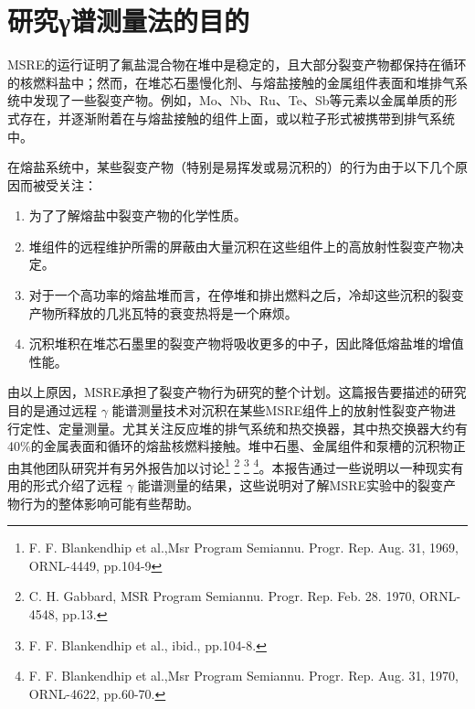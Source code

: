 \chapter{研究γ谱测量法的目的}
MSRE的运行证明了氟盐混合物在堆中是稳定的，且大部分裂变产物都保持在循环的核燃料盐中；然而，在堆芯石墨慢化剂、与熔盐接触的金属组件表面和堆排气系统中发现了一些裂变产物。例如，Mo、Nb、Ru、Te、Sb等元素以金属单质的形式存在，并逐渐附着在与熔盐接触的组件上面，或以粒子形式被携带到排气系统中。

在熔盐系统中，某些裂变产物（特别是易挥发或易沉积的）的行为由于以下几个原因而被受关注：
\begin{enumerate}
\item 为了了解熔盐中裂变产物的化学性质。
\item 堆组件的远程维护所需的屏蔽由大量沉积在这些组件上的高放射性裂变产物决定。
\item 对于一个高功率的熔盐堆而言，在停堆和排出燃料之后，冷却这些沉积的裂变产物所释放的几兆瓦特的衰变热将是一个麻烦。
\item 沉积堆积在堆芯石墨里的裂变产物将吸收更多的中子，因此降低熔盐堆的增值性能。
\end{enumerate}
由以上原因，MSRE承担了裂变产物行为研究的整个计划。这篇报告要描述的研究目的是通过远程 $\gamma$ 能谱测量技术对沉积在某些MSRE组件上的放射性裂变产物进行定性、定量测量。尤其关注反应堆的排气系统和热交换器，其中热交换器大约有40\%的金属表面和循环的熔盐核燃料接触。堆中石墨、金属组件和泵槽的沉积物正由其他团队研究并有另外报告加以讨论\footnote{F. F. Blankendhip et al.,Msr Program Semiannu. Progr. Rep. Aug. 31, 1969, ORNL-4449, pp.104-9} \footnote{C. H. Gabbard, MSR Program Semiannu. Progr. Rep. Feb. 28. 1970, ORNL-4548, pp.13.} \footnote{F. F. Blankendhip et al., ibid., pp.104-8.} \footnote{F. F. Blankendhip et al.,Msr Program Semiannu. Progr. Rep. Aug. 31, 1970, ORNL-4622, pp.60-70.}。本报告通过一些说明以一种现实有用的形式介绍了远程 $\gamma$ 能谱测量的结果，这些说明对了解MSRE实验中的裂变产物行为的整体影响可能有些帮助。

